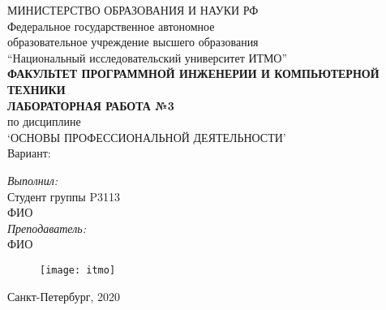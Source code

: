 \begin{center}
МИНИСТЕРСТВО ОБРАЗОВАНИЯ И НАУКИ РФ\\
\hfill \break
Федеральное государственное автономное\\ 
образовательное учреждение высшего образования\\
``Национальный исследовательский университет ИТМО''\\
\hfill \break
\textbf{ФАКУЛЬТЕТ ПРОГРАММНОЙ ИНЖЕНЕРИИ И КОМПЬЮТЕРНОЙ ТЕХНИКИ}\\
\vspace{2.5cm}
\large{\textbf{ЛАБОРАТОРНАЯ РАБОТА №3}}\\
по дисциплине\\
\large{`ОСНОВЫ ПРОФЕССИОНАЛЬНОЙ ДЕЯТЕЛЬНОСТИ'}\\
\hfill \break
Вариант: \\
\end{center}

\vspace{8cm}
 
\begin{flushright}
\textit{Выполнил:}\\
Студент группы P3113\\
ФИО\\
\textit{Преподаватель:}\\
ФИО\\
\end{flushright}
 
\vfill

\begin{figure}[H]
\centering
\texttt{[image: itmo]}
\end{figure}
\begin{center} Санкт-Петербург, 2020 \end{center}

\thispagestyle{empty}
\newpage